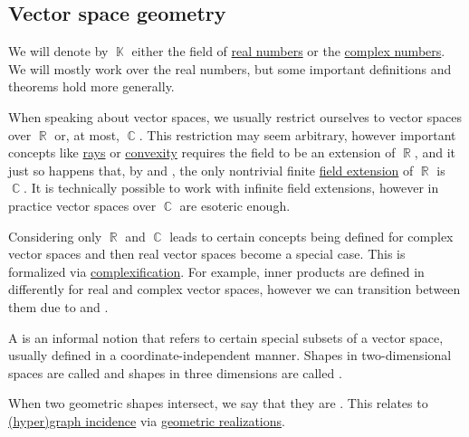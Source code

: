 \subsection{Vector space geometry}\label{subsec:vector_space_geometry}

We will denote by \( \BbbK \) either the field of \hyperref[def:real_numbers]{real numbers} or the \hyperref[def:real_numbers]{complex numbers}. We will mostly work over the real numbers, but some important definitions and theorems hold more generally.

\begin{remark}\label{rem:real_field_extensions}
  When speaking about vector spaces, we usually restrict ourselves to vector spaces over \( \BbbR \) or, at most, \( \BbbC \). This restriction may seem arbitrary, however important concepts like \hyperref[def:geometric_ray]{rays} or \hyperref[def:convex_set]{convexity} requires the field to be an extension of \( \BbbR \), and it just so happens that, by  and , the only nontrivial finite \hyperref[def:field/submodel]{field extension} of \( \BbbR \) is \( \BbbC \). It is technically possible to work with infinite field extensions, however in practice vector spaces over \( \BbbC \) are esoteric enough.

  Considering only \( \BbbR \) and \( \BbbC \) leads to certain concepts being defined for complex vector spaces and then real vector spaces become a special case. This is formalized via \hyperref[def:complexification]{complexification}. For example, inner products are defined in  differently for real and complex vector spaces, however we can transition between them due to  and .
\end{remark}

\begin{definition}\label{def:geometric_shape}
  A  is an informal notion that refers to certain special subsets of a vector space, usually defined in a coordinate-independent manner. Shapes in two-dimensional spaces are called  and shapes in three dimensions are called .

  When two geometric shapes intersect, we say that they are . This relates to \hyperref[def:hypergraph/incidence]{(hyper)graph incidence} via \hyperref[def:quiver_geometric_realization]{geometric realizations}.
\end{definition}

